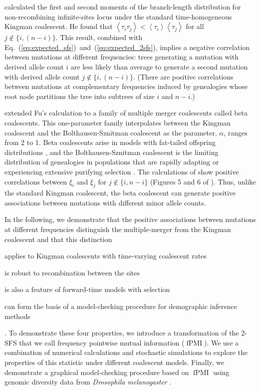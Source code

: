\documentclass[11pt, letterpaper]{article}   	%
\newcommand{\eqs}[2]{Eq.~(\ref{#1})~and~(\ref{#2})}
\newcommand{\E}[1]{\left< #1 \right>}
\DeclareMathOperator{\fpmi}{fPMI}
\begin{document}
\textcite{Fu1995} calculated the first and second moments of the branch-length distribution for non-recombining infinite-sites locus under the standard time-homogeneous Kingman coalescent.
He found that $\E{\tau_i \tau_j} < \E{\tau_i}\E{\tau_j}$ for all $j \not\in \{i, (n-i)\}$.
This result, combined with \eqs{eq:expected_sfs}{eq:expected_2sfs}, implies a negative correlation between mutations at different frequencies: trees generating a mutation with derived allele count $i$ are less likely than average to generate a second mutation with derived allele count $j \not\in \{i, (n-i)\}$.
(There are positive correlations between mutations at complementary frequencies induced by genealogies whose root node partitions the tree into subtrees of size $i$ and $n-i$.)

\textcite{BirknerEtAl2013} extended Fu's calculation to a family of multiple merger coalescents called beta coalescents.
This one-parameter family interpolates between the Kingman coalescent and the Bolthausen-Sznitman coalescent as the parameter, $\alpha$, ranges from 2 to 1.
Beta coalescents arise in models with fat-tailed offspring distributions \autocite{Schweinsberg2003, SteinruckenEtAl2013}, and the Bolthausen-Sznitman coalescent is the limiting distribution of genealogies in populations that are rapidly adapting or experiencing extensive purifying selection \autocite{NeherHallatschek2013}.
The calculations of \textcite{BirknerEtAl2013} show positive correlations between $\xi_i$ and $\xi_j$ for $j \not\in \{i, n-i\}$ (Figures 5 and 6 of \cite{BirknerEtal2013}).
Thus, unlike the standard Kingman coalescent, the beta coalescent can generate positive associations between mutations with different minor allele counts.

In the following, we demonstrate that the positive associations between mutations at different frequencies distinguish the multiple-merger from the Kingman coalescent and that this distinction
\begin{enumerate*}[label=(\roman*), before=\unskip{: }, itemjoin={{; }}, itemjoin*={{, and }}]
    \item applies to Kingman coalescents with time-varying coalescent rates
    \item is robust to recombination between the sites
    \item is also a feature of forward-time models with selection
    \item can form the basis of a model-checking procedure for demographic inference methods
\end{enumerate*}.
To demonstrate these four properties, we introduce a transformation of the 2-SFS that we call frequency pointwise mutual information ($\fpmi$).
We use a combination of numerical calculations and stochastic simulations to explore the properties of this statistic under different coalescent models.
Finally, we demonstrate a graphical model-checking procedure based on $\fpmi$ using genomic diversity data from \textit{Drosophila melanogaster} \autocite{LackEtAl2015}.
\end{document}
